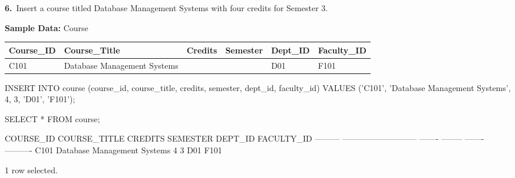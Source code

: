 \noindent\begin{minipage}{\linewidth}
\begingroup{}
{\fontsize{14}{17}\selectfont\textbf{6.}}\ Insert a course titled Database Management Systems with four credits for Semester 3.\par
\endgroup\vspace{12pt}

\noindent\textbf{Sample Data:} Course\par
\vspace{6pt}
{\small\setlength{\tabcolsep}{4pt}
\renewcommand{\arraystretch}{1.25}
\noindent\begin{tabular}{|>{\raggedright\arraybackslash}p{66.3pt}|>{\raggedright\arraybackslash}p{154.9pt}|>{\raggedleft\arraybackslash}p{49.6pt}|>{\raggedleft\arraybackslash}p{57.7pt}|>{\raggedright\arraybackslash}p{55.3pt}|>{\raggedright\arraybackslash}p{68.1pt}|}
\hline
\textbf{Course\_ID} & \textbf{Course\_Title} & \textbf{Credits} & \textbf{Semester} & \textbf{Dept\_ID} & \textbf{Faculty\_ID} \\ \hline
C101 & Database Management Systems & 4 & 3 & D01 & F101 \\ \hline
\end{tabular}\par}
\vspace{14pt}

\begin{sqlcode}
INSERT INTO course (course_id, course_title, credits, semester, dept_id, faculty_id)
VALUES ('C101', 'Database Management Systems', 4, 3, 'D01', 'F101');

SELECT * FROM course;
\end{sqlcode}

\vspace{18pt}


\begin{sqlout}[fontsize=\small]
COURSE_ID  COURSE_TITLE                 CREDITS  SEMESTER  DEPT_ID  FACULTY_ID
---------  ---------------------------  -------  --------  -------  ----------
C101       Database Management Systems        4         3  D01      F101

1 row selected.
\end{sqlout}
\end{minipage}\par\vspace{24pt}

